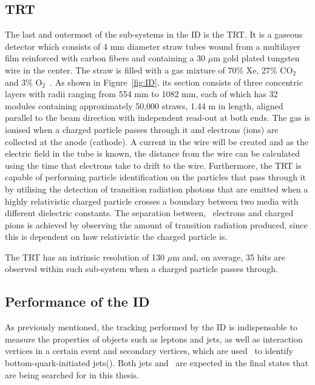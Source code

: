 			\subsection*{TRT}
			 
				The last and outermost of the sub-systems in the \ac{ID} is the \ac{TRT}. It is a gaseous detector which consists of 4 mm diameter straw tubes wound from a multilayer film reinforced with carbon fibers and containing a 30 $\mu$m gold plated tungsten wire in the center. The straw is filled with a gas mixture of 70\% Xe, 27\% CO$_2$ and 3\% O$_2$~\cite{TRT2012}. As shown in Figure~\ref{fig:ID}, its section consists of three concentric layers with radii ranging from 554 mm to 1082 mm, each of which has 32 modules containing approximately 50,000 straws, 1.44 m in length, aligned parallel to the beam direction with independent read-out at both ends. The gas is ionised when a charged particle passes through it and electrons (ions) are collected at the anode (cathode). A current in the wire will be created and as the electric field in the tube is known, the distance from the wire can be calculated using the time that electrons take to drift to the wire. 
				Furthermore, the \ac{TRT} is capable of performing particle identification on the particles that pass through it by utilising the detection of transition radiation photons that are emitted when a highly relativistic charged particle crosses a boundary between two media with different dielectric constants. The separation between, \eg\ electrons and charged pions is achieved by observing the amount of transition radiation produced, since this is dependent on how relativistic the charged particle is.

				The \ac{TRT} has an intrinsic resolution of 130 $\mu$m and, on average, 35 hits are observed within such sub-system when a charged particle passes through.


			\subsection*{Performance of the ID}

				As previously mentioned, the tracking performed by the \ac{ID} is indispensable to measure the properties of objects such as leptons and jets, as well as interaction vertices in a certain event and secondary vertices, which are used \eg\ to identify bottom-quark-initiated jets(\bjs). Both jets and \bjs\ are expected in the final states that are being searched for in this thesis. 

